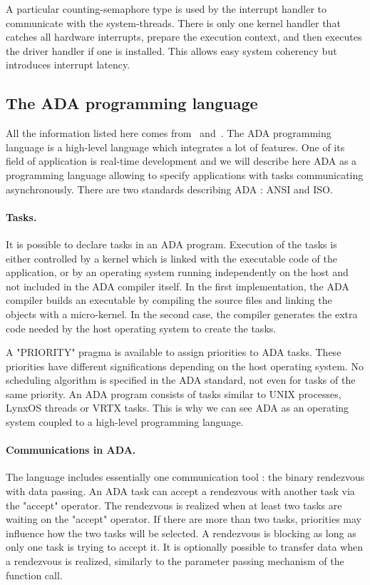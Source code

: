 \documentclass[10pt]{report}
\begin{document}
A particular counting-semaphore type is used by the interrupt handler to communicate with the system-threads. There is only one
kernel handler that catches all hardware interrupts, prepare the execution context, and then executes the driver handler if one is installed.
This allows easy system coherency but introduces interrupt latency.

\subsection{The ADA programming language}

All the information listed here comes from~\cite{Booch:86} and~\cite{ADA:83}. The ADA programming language is a high-level language
which integrates a lot of features. One of its field of application is real-time development and we will describe here ADA
as a programming language allowing to specify applications with tasks communicating asynchronously. There are two standards
describing ADA : ANSI and ISO.

\paragraph{Tasks.} It is possible to declare tasks in an ADA program. Execution of the tasks is either controlled by a kernel which is 
linked with the executable code of the application, or by an operating system running independently on the host and not included in 
the ADA compiler itself. In the first implementation, the ADA compiler builds an executable by compiling the source files and linking the objects 
with a micro-kernel. In the second case, the compiler generates the extra code needed by the host operating system to create the tasks.

A "PRIORITY" pragma is available to assign priorities to ADA tasks. These priorities have different significations
depending on the host operating system. No scheduling algorithm is specified in the ADA standard, not even for tasks of the same priority. 
An ADA program consists of tasks similar to UNIX processes, LynxOS threads or VRTX tasks. This is why we can see ADA as an operating system 
coupled to a high-level programming language.

\paragraph{Communications in ADA.} The language includes essentially one communication tool : the binary rendezvous with data passing.
An ADA task can accept a rendezvous with another task via the "accept" operator. The rendezvous is realized when at least two
tasks are waiting on the "accept" operator. If there are more than two tasks, priorities may influence how the two tasks will be selected.
A rendezvous is blocking as long as only one task is trying to accept it. It is optionally possible to transfer data when a
rendezvous is realized, similarly to the parameter passing mechanism of the function call.
\end{document}
